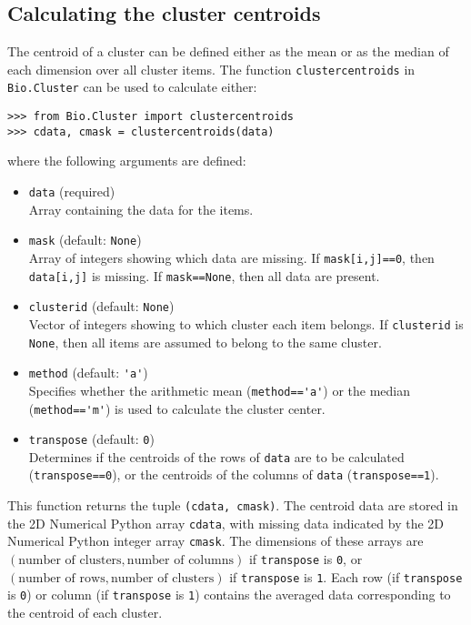 \documentclass{report}
\begin{document}
\subsection*{Calculating the cluster centroids}
\label{subsec:clustercentroids}

The centroid of a cluster can be defined either as the mean or as the median of each dimension over all cluster items. The function \verb|clustercentroids| in \verb|Bio.Cluster| can be used to calculate either:

\begin{verbatim}
>>> from Bio.Cluster import clustercentroids
>>> cdata, cmask = clustercentroids(data)
\end{verbatim}
where the following arguments are defined:
\begin{itemize}
\item \verb|data| (required) \\
Array containing the data for the items.
\item \verb|mask| (default: \verb|None|) \\
Array of integers showing which data are missing. If \verb|mask[i,j]==0|, then \verb|data[i,j]| is missing. If \verb|mask==None|, then all data are present.
\item \verb|clusterid| (default: \verb|None|) \\
Vector of integers showing to which cluster each item belongs. If \verb|clusterid| is \verb|None|, then all items are assumed to belong to the same cluster.
\item \verb|method| (default: \verb|'a'|) \\
Specifies whether the arithmetic mean (\verb|method=='a'|) or the median (\verb|method=='m'|) is used to calculate the cluster center.
\item \verb|transpose| (default: \verb|0|) \\
Determines if the centroids of the rows of \verb|data| are to be calculated (\verb|transpose==0|), or the centroids of the columns of \verb|data| (\verb|transpose==1|).
\end{itemize}

This function returns the tuple \verb|(cdata, cmask)|. The centroid data are stored in the 2D Numerical Python array \verb|cdata|, with missing data indicated by the 2D Numerical Python integer array \verb|cmask|.  The dimensions of these arrays are $\left(\textrm{number of clusters}, \textrm{number of columns}\right)$ if \verb|transpose| is \verb|0|, or $\left(\textrm{number of rows}, \textrm{number of clusters}\right)$ if \verb|transpose| is \verb|1|. Each row (if \verb|transpose| is \verb|0|) or column (if \verb|transpose| is \verb|1|) contains the averaged data corresponding to the centroid of each cluster.
\end{document}

